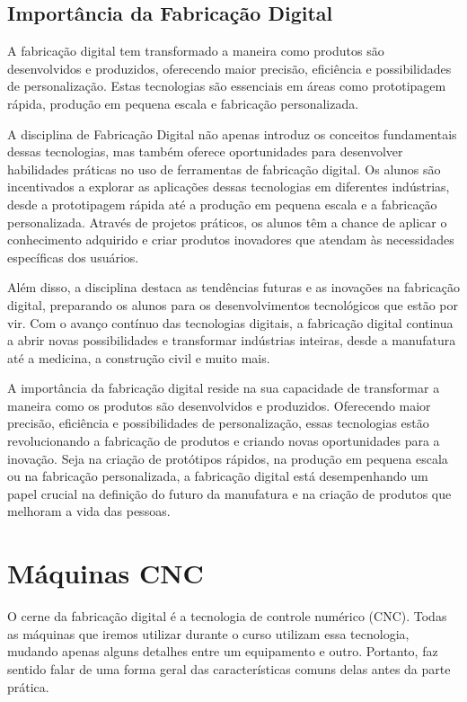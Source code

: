 \documentclass[
]{book}
\begin{document}
\section{Importância da Fabricação Digital}\label{importuxe2ncia-da-fabricauxe7uxe3o-digital}

A fabricação digital tem transformado a maneira como produtos são desenvolvidos e produzidos, oferecendo maior precisão, eficiência e possibilidades de personalização. Estas tecnologias são essenciais em áreas como prototipagem rápida, produção em pequena escala e fabricação personalizada.

A disciplina de Fabricação Digital não apenas introduz os conceitos fundamentais dessas tecnologias, mas também oferece oportunidades para desenvolver habilidades práticas no uso de ferramentas de fabricação digital. Os alunos são incentivados a explorar as aplicações dessas tecnologias em diferentes indústrias, desde a prototipagem rápida até a produção em pequena escala e a fabricação personalizada. Através de projetos práticos, os alunos têm a chance de aplicar o conhecimento adquirido e criar produtos inovadores que atendam às necessidades específicas dos usuários.

Além disso, a disciplina destaca as tendências futuras e as inovações na fabricação digital, preparando os alunos para os desenvolvimentos tecnológicos que estão por vir. Com o avanço contínuo das tecnologias digitais, a fabricação digital continua a abrir novas possibilidades e transformar indústrias inteiras, desde a manufatura até a medicina, a construção civil e muito mais.

A importância da fabricação digital reside na sua capacidade de transformar a maneira como os produtos são desenvolvidos e produzidos. Oferecendo maior precisão, eficiência e possibilidades de personalização, essas tecnologias estão revolucionando a fabricação de produtos e criando novas oportunidades para a inovação. Seja na criação de protótipos rápidos, na produção em pequena escala ou na fabricação personalizada, a fabricação digital está desempenhando um papel crucial na definição do futuro da manufatura e na criação de produtos que melhoram a vida das pessoas.

\chapter{Máquinas CNC}\label{muxe1quinas-cnc}

O cerne da fabricação digital é a tecnologia de controle numérico (CNC). Todas as máquinas que iremos utilizar durante o curso utilizam essa tecnologia, mudando apenas alguns detalhes entre um equipamento e outro. Portanto, faz sentido falar de uma forma geral das características comuns delas antes da parte prática.
\end{document}
